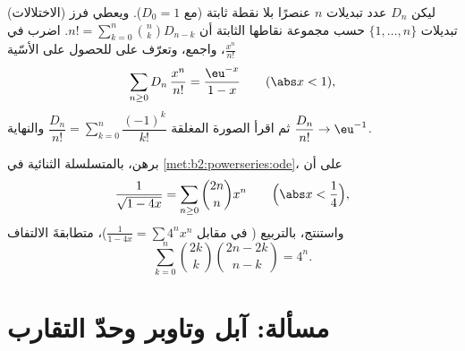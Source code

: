 \begin{exercise}[$\star\star$]\label{exo:b2:powerseries:11}
(الاختلالات) ليكن $D_n$ عدد تبديلات $n$
عنصرًا بلا نقطة ثابتة (مع $D_0 = 1$). ويعطي فرز
تبديلات $\{1, \dots, n\}$ حسب مجموعة نقاطها الثابتة أن
$n! = \sum_{k=0}^{n}\binom nk D_{n-k}$. اضرب في
$\frac{x^n}{n!}$، واجمع، وتعرّف على  للحصول على
 الأسّية
\[
\sum_{n\geq0} D_n\,\frac{x^n}{n!} = \frac{\eu^{-x}}{1-x}
\qquad (\abs x < 1),
\]
ثم اقرأ الصورة المغلقة $\dfrac{D_n}{n!} =
\sum_{k=0}^{n}\dfrac{(-1)^k}{k!}$ والنهاية $\dfrac{D_n}{n!}
\to \eu^{-1}$.
\end{exercise}

\begin{exercise}[$\star\star\star$]\label{exo:b2:powerseries:12}
برهن، بالمتسلسلة الثنائية في
\cref{met:b2:powerseries:ode}، على أن
\[
\frac{1}{\sqrt{1 - 4x}} = \sum_{n\geq0}\binom{2n}{n}x^n
\qquad \Bigl(\abs x < \frac14\Bigr),
\]
واستنتج، بالتربيع ( في مقابل
$\frac{1}{1-4x} = \sum 4^nx^n$)، متطابقةَ الالتفاف
\[
\sum_{k=0}^{n}\binom{2k}{k}\binom{2n-2k}{n-k} = 4^n .
\]
\end{exercise}

\section{مسألة: آبل وتاوبر وحدّ التقارب}

